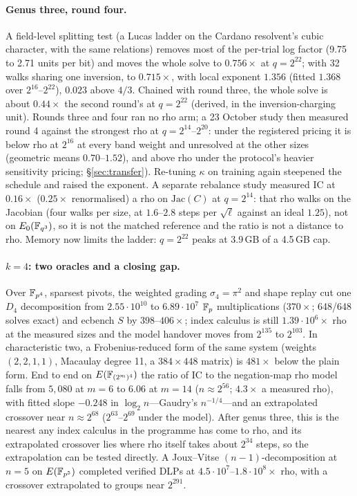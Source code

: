 \paragraph{Genus three, round four.} A field-level splitting test (a Lucas
ladder on the Cardano resolvent's cubic character, with the same relations)
removes most of the per-trial log factor (9.75 to 2.71 units per bit) and
moves the whole solve to $0.756\times$ at $q=2^{22}$; with 32 walks sharing
one inversion, to $0.715\times$, with local exponent $1.356$ (fitted
$1.368$ over $2^{16}$--$2^{22}$), $0.023$ above $4/3$. Chained with round
three, the whole solve is about $0.44\times$ the second round's at
$q=2^{22}$ (derived, in the inversion-charging unit). Rounds three and four
ran no rho arm; a 23 October study then measured round 4 against the
strongest rho at $q=2^{14}$--$2^{20}$: under the registered pricing it is
below rho at $2^{16}$ at every band weight and unresolved at the other
sizes (geometric means $0.70$--$1.52$), and above rho under the protocol's
heavier sensitivity pricing; \S\ref{sec:transfer}). Re-tuning $\kappa$ on training again steepened the schedule
and raised the exponent. A separate rebalance study measured IC at
$0.16\times$ ($0.25\times$ renormalised) a rho on $\mathrm{Jac}(C)$ at
$q=2^{14}$: that rho walks on the Jacobian (four walks per size, at
$1.6$--$2.8$ steps per $\sqrt\ell$ against an ideal $1.25$), not on
$E_0(\mathbb{F}_{q^3})$, so it is not the matched reference and the ratio is not
a distance to rho.
Memory now limits the ladder: $q=2^{22}$ peaks at 3.9\,GB of a 4.5\,GB cap.

\paragraph{$k=4$: two oracles and a closing gap.} Over $\mathbb{F}_{p^4}$, sparsest
pivots, the weighted grading $\sigma_4=\pi^2$ and shape replay cut one $D_4$
decomposition from $2.55\cdot10^{10}$ to $6.89\cdot10^7$ $\mathbb{F}_p$
multiplications ($370\times$; 648/648 solves exact) and ecbench $S$ by
$398$--$406\times$; index calculus is still $1.39\cdot10^6\times$ rho at
the measured sizes and the model handover moves from $2^{135}$ to $2^{103}$.
In characteristic two, a Frobenius-reduced form of the same system
(weights $(2,2,1,1)$, Macaulay degree 11, a $384\times448$ matrix) is
$481\times$ below the plain form. End to end on $E(\mathbb{F}_{(2^m)^4})$ the
ratio of IC to the negation-map rho model falls from $5{,}080$ at $m=6$ to
$6.06$ at $m=14$ ($n\approx2^{56}$; $4.3\times$ a measured rho), with fitted
slope $-0.248$ in $\log_2 n$---Gaudry's $n^{-1/4}$---and an extrapolated
crossover near $n\approx2^{68}$ ($2^{63}$--$2^{69}$ under the model).
After genus three, this is the nearest any index calculus in the programme
has come to rho, and its extrapolated crossover lies where rho itself takes
about $2^{34}$ steps, so the extrapolation can be tested directly. A Joux--Vitse
$(n-1)$-decomposition at $n=5$ on $E(\mathbb{F}_{p^5})$ completed verified DLPs at
$4.5\cdot10^7$--$1.8\cdot10^8\times$ rho, with a crossover extrapolated to
groups near $2^{291}$.

